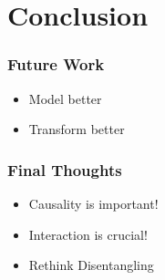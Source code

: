 \section{Conclusion}
	\begin{frame}[t]
	\frametitle{Future Work}
		\begin{itemize}
			\item Model better
			\item Transform better
		\end{itemize}
	\end{frame}


	\begin{frame}[t]
	\frametitle{Final Thoughts}
		\begin{itemize}
			\item Causality is important!
			\item Interaction is crucial!
			\item Rethink Disentangling  %
		\end{itemize}
	\end{frame}

